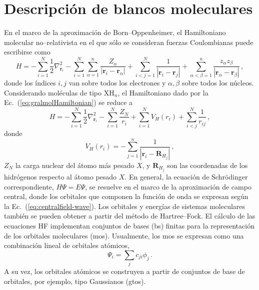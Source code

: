 \section{Descripción de blancos moleculares}
\label{sec:moleculas}

En el marco de la aproximación de Born--Oppenheimer, el Hamiltoniano 
molecular no--relativista en el que sólo se consideran fuerzas 
Coulombianas puede escribirse como
\begin{equation}
H = - \sum_{i=1}^N \frac{1}{2} \nabla^2_{\mathbf{r}_i} 
    - \sum_{i=1}^N \sum_{\alpha=1}^n \frac{Z_{\alpha}}{
    \left|\mathbf{r}_i-\mathbf{r}_{\alpha}\right|} 
    + \sum_{i<j=1}^N \frac{1}{\left|\mathbf{r}_i-\mathbf{r}_j\right|} 
    + \sum_{\alpha<\beta=1}^n \frac{z_{\alpha}z_{\beta}}{
    \left|\mathbf{r}_{\alpha}-\mathbf{r}_{\beta}\right|}\,,
\label{eq:gralmolHamiltonian}
\end{equation}
donde los índices $i,j$ van sobre todos los electrones y $\alpha,\beta$ 
sobre todos los núcleos. Considerando moléculas de tipo XH$_n$, el 
Hamiltoniano dado por la Ec.~(\ref{eq:gralmolHamiltonian}) se reduce a 
\begin{equation}
H = -\sum_{i=1}^N \frac{1}{2} \nabla^2_{\mathbf{r}_i} 
    - \sum_{i=1}^N \frac{Z_N}{r_i} 
    + \sum_{i=1}^N V_H(r_i)
    + \sum_{i<j}^N \frac{1}{r_{ij}}\,,
\end{equation}
donde
\begin{equation}
V_H(r_i)=
-\sum_{j=1}^{n} \frac{1}{\left|\mathbf{r}_i-\mathbf{R}_{H_j}\right|}\,,
\label{eq:Vhidrogenos}
\end{equation}
$Z_N$ la carga nuclear del átomo más pesado $X$, y $\mathbf{R}_{H_j}$ 
son las coordenadas de los hidrógenos respecto al átomo pesado $X$. En 
general, la ecuación de Schr\"odinger correspondiente, $H\Psi=E\Psi$, se 
resuelve en el marco de la aproximación de campo central, donde los 
orbitales que componen la función de onda se expresan según la 
Ec.~(\ref{eq:centralfield-wave}). Los orbitales y energías de sistemas 
moleculares también se pueden obtener a partir del método de 
Hartree--Fock. El cálculo de las ecuaciones HF implementan conjuntos de 
bases (\acs{bs}) finitas para la representación de los orbitales 
moleculares (\acsp{mo}). Usualmente, los \acsp{mo} se expresan como una 
combinación lineal de orbitales atómicos, 
\begin{equation}
\Psi_i=\sum_j c_{ji} \phi_j\,.
\end{equation}
A su vez, los orbitales atómicos se construyen a partir de conjuntos de 
base de orbitales, por ejemplo, tipo Gaussianos (\acsp{gto}).

